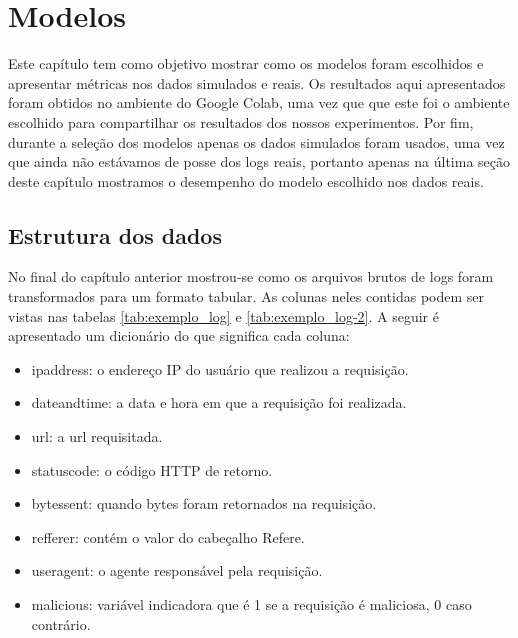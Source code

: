 
\chapter{Modelos}
\label{cap:models}

Este capítulo tem como objetivo mostrar como os modelos foram escolhidos e apresentar
métricas nos dados simulados e reais. Os resultados aqui apresentados foram obtidos no 
ambiente do Google Colab, uma vez que que este foi o ambiente escolhido para compartilhar 
os resultados dos nossos experimentos. Por fim, durante a seleção dos modelos apenas os dados 
simulados foram usados, uma vez que ainda não estávamos de posse dos logs reais, portanto 
apenas na última seção deste capítulo mostramos o desempenho do modelo escolhido nos dados reais.


\section{Estrutura dos dados}

No final do capítulo anterior mostrou-se como os arquivos brutos de logs foram transformados
para um formato tabular. As colunas neles contidas podem ser vistas nas tabelas \ref{tab:exemplo_log} e \ref{tab:exemplo_log-2}. 
A seguir é apresentado um dicionário do que significa cada coluna:


\begin{itemize}
    \item ipaddress: o endereço IP do usuário que realizou a requisição.
    \item dateandtime: a data e hora em que a requisição foi realizada.
    \item url: a url requisitada.
    \item statuscode: o código HTTP de retorno.
    \item bytessent: quando bytes foram retornados na requisição.
    \item refferer: contém o valor do cabeçalho Refere.
    \item useragent: o agente responsável pela requisição.
    \item malicious: variável indicadora que é 1 se a requisição é maliciosa, 0 caso contrário.
\end{itemize}


